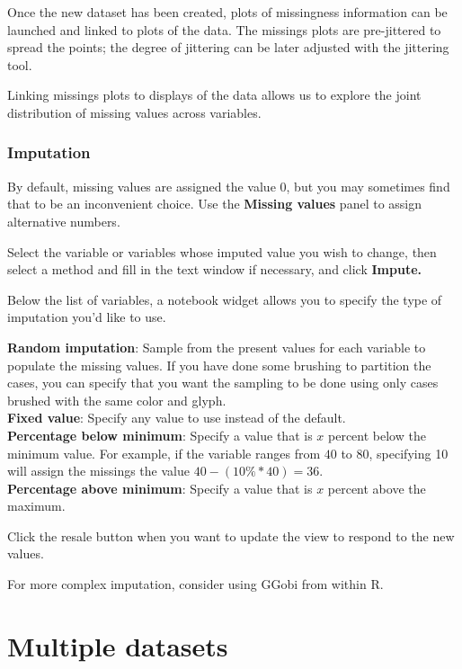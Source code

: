\documentclass[11pt]{article}
\def\Widget#1{\textbf{#1}}
\begin{document}
{Once the new dataset has been created, plots of missingness information
can be launched and linked to plots of the data.  The missings plots
are pre-jittered to spread the points; the degree of jittering can
be later adjusted with the jittering tool.

Linking missings plots to displays of the data allows us to explore the
joint distribution of missing values across variables.

\subsubsection{Imputation}

%
By default, missing values are assigned the value $0$, but you
may sometimes find that to be an inconvenient choice.  Use the
\Widget{Missing values} panel to assign alternative numbers.

Select the variable or variables whose imputed value you
wish to change, then select a method and fill in the text window
if necessary, and click \Widget{Impute.}

Below the list of variables, a notebook widget allows you to specify
the type of imputation you'd like to use.

\Widget{Random imputation}: Sample from the present values for each variable
  to populate the missing values.  If you have done some brushing to
  partition the cases, you can specify that you want the sampling to be
  done using only cases brushed with the same color and glyph.
\\\Widget{Fixed value}: Specify any value to use instead of the default.
\\\Widget{Percentage below minimum}: Specify a value that is $x$ percent
  below the minimum value.  For example, if the variable ranges from
 $40$ to $80$, specifying 10 will assign the missings the value $40 - (10\%
 * 40) = 36$.
\\\Widget{Percentage above minimum}: Specify a value that is $x$ percent
above the maximum.

Click the resale button when you want to update the view to
respond to the new values.

For more complex imputation, consider using GGobi from within R.

%
%

\section{Multiple datasets}

}
\end{document}
